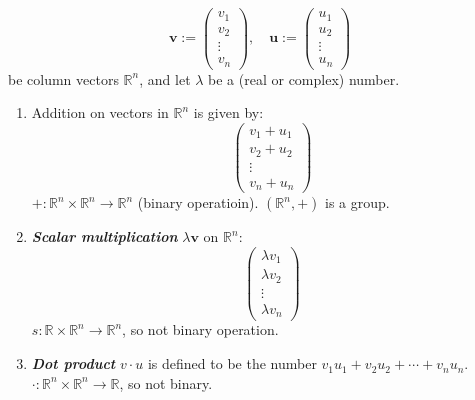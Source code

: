\documentclass[12pt]{report}
\theoremstyle{definition}
\begin{document}
    \[
        \pmb{v} := \begin{pmatrix}
                v_1\\
                v_2\\
                \vdots\\
                v_n
        \end{pmatrix}, \quad
        \pmb{u} := \begin{pmatrix}
                u_1\\
                u_2\\
                \vdots\\
                u_n
            \end{pmatrix}
    \]
    be column vectors $\mathbb{R}^{n}$, and let $\lambda$ be a (real or complex) number.
    \begin{enumerate}[label = (\arabic*)]
        \item Addition on vectors in $\mathbb{R}^{n}$ is given by:\[
                \begin{pmatrix}
                        v_1 + u_1\\
                        v_2 + u_2\\
                        \vdots\\
                        v_n + u_n
                \end{pmatrix}
            \]$+ : \mathbb{R}^{n} \times \mathbb{R}^{n} \rightarrow \mathbb{R}^{n}$ (binary operatioin).
            $(\mathbb{R}^{n}, +)$ is a group.
        \item \textbf{\emph{Scalar multiplication}} $\lambda \pmb{v}$ on $\mathbb{R}^{n}$:\[
            \begin{pmatrix}
                    \lambda v_1\\
                    \lambda v_2\\
                    \vdots\\
                    \lambda v_n
            \end{pmatrix}
        \]$s : \mathbb{R} \times \mathbb{R}^{n} \rightarrow \mathbb{R}^{n}$, so not binary operation.
    \item \textbf{\emph{Dot product}} $v \cdot u$ is defined to be the number $v_1 u_1 + v_2 u_2 + \cdots + v_n u_n$.
            $\cdot : \mathbb{R}^{n} \times \mathbb{R}^{n} \rightarrow \mathbb{R}$, so not binary.
    \end{enumerate}
\end{document}
